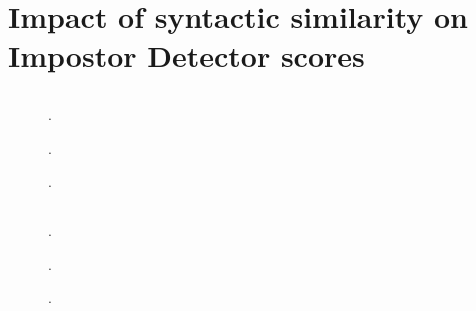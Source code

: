 \section{Impact of syntactic similarity on Impostor Detector scores}
\label{sec:syn_sim_impact}

\subsection{\dataStudent{}}
\begin{figure}[htbp]
    \centering
    
    \caption{.}
    \label{fig:impact_syn_student_diff}
\end{figure}

\begin{figure}[htbp]
    \centering
    
    \caption{.}
    \label{fig:impact_syn_student_disp_cand}
\end{figure}

\begin{figure}[htbp]
    \centering
    
    \caption{.}
    \label{fig:impact_syn_student_ref_paraph}
\end{figure}

\subsection{\dataBlog{}}
\begin{figure}[htbp]
    \centering
    
    \caption{.}
    \label{fig:impact_syn_student_diff_acc}
\end{figure}

\begin{figure}[htbp]
    \centering
    
    \caption{.}
    \label{fig:impact_syn_student_diff_prec}
\end{figure}

\begin{figure}[htbp]
    \centering
    
    \caption{.}
    \label{fig:impact_syn_student_diff_f1}
\end{figure}